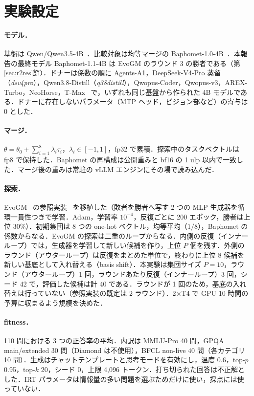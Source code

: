 \documentclass[uplatex,dvipdfmx,10pt,a4paper]{jsarticle}
\begin{document}
\section{実験設定}\label{sec:r1setup}
\paragraph{モデル．}基盤は Qwen/Qwen3.5-4B~\cite{qwen}．比較対象は均等マージの Baphomet-1.0-4B~\cite{baph}．本報告の最終モデル Baphomet-1.1-4B は EvoGM のラウンド 3 の勝者である（第\ref{sec:r2res}節）．ドナーは係数の順に Agents-A1，DeepSeek-V4-Pro 蒸留（\textit{dsv4pro}），Qwen3.8-Distill（\textit{q38distill}），Qwopus-Coder，Qwopus-v3，AREX-Turbo，NeoHorse，T-Max~\cite{m1,m2,m3,m4,m5,m6,m7,m8} で，いずれも同じ基盤から作られた 4B モデルである．ドナーに存在しないパラメータ（MTP ヘッド，ビジョン部など）の寄与は 0 とした．

\paragraph{マージ．}$\theta=\theta_0+\sum_{i=1}^{8}\lambda_i\tau_i$，$\lambda_i\in[-1,1]$，fp32 で累積．探索中のタスクベクトルは fp8 で保持した．Baphomet の再構成は公開重みと bf16 の 1 ulp 以内で一致した．マージ後の重みは常駐の vLLM エンジンにその場で読み込んだ．

\paragraph{探索．}EvoGM~\cite{evogm} の参照実装~\cite{evogmcode} を移植した（敗者を勝者へ写す 2 つの MLP 生成器を循環一貫性つきで学習．Adam，学習率 $10^{-4}$，反復ごとに 200 エポック，勝者は上位 30\%）．初期集団は 8 つの one-hot ベクトル，均等平均（$1/8$），Baphomet の係数からなる．EvoGM の探索は二重のループからなる．内側の反復（インナーループ）では，生成器を学習して新しい候補を作り，上位 $P$ 個を残す．外側のラウンド（アウターループ）は反復をまとめた単位で，終わりに上位 8 候補を新しい基底として入れ替える（basis shift）．本実験は集団サイズ $P=10$，ラウンド（アウターループ）1 回，ラウンドあたり反復（インナーループ）3 回，シード 42 で，評価した候補は計 40 である．ラウンドが 1 回のため，基底の入れ替えは行っていない（参照実装の既定は 2 ラウンド）．2$\times$T4 で GPU 10 時間の予算に収まるよう規模を決めた．

\paragraph{fitness．}110 問における 3 つの正答率の平均．内訳は MMLU-Pro 40 問，GPQA main/extended 30 問（Diamond は不使用），BFCL non-live 40 問（各カテゴリ 10 問）．生成はチャットテンプレートと思考モードを有効にし，温度 0.6，top-$p$ 0.95，top-$k$ 20，シード 0，上限 4,096 トークン．打ち切られた回答は不正解とした．IRT パラメータは情報量の多い問題を選ぶためだけに使い，採点には使っていない．
\end{document}
